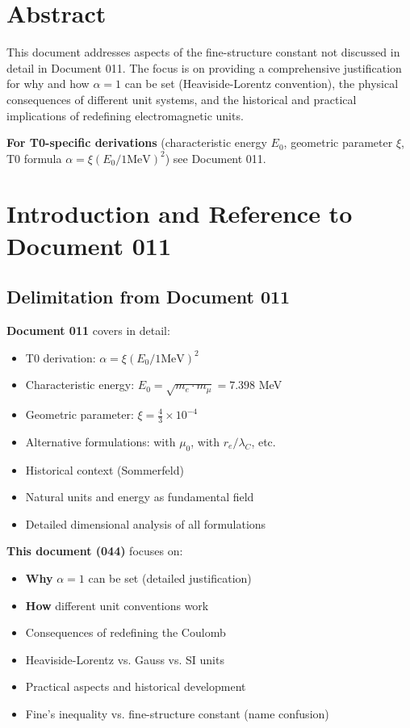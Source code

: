 \section*{Abstract}
		This document addresses aspects of the fine-structure constant not discussed in detail in Document 011. The focus is on providing a comprehensive justification for why and how $\alpha = 1$ can be set (Heaviside-Lorentz convention), the physical consequences of different unit systems, and the historical and practical implications of redefining electromagnetic units.
		
		\textbf{For T0-specific derivations} (characteristic energy $E_0$, geometric parameter $\xi$, T0 formula $\alpha = \xi(E_0/1\text{MeV})^2$) see Document 011.

	
	
	
	\section{Introduction and Reference to Document 011}
	
	\subsection{Delimitation from Document 011}
	
	\textbf{Document 011} covers in detail:
	\begin{itemize}
		\item T0 derivation: $\alpha = \xi(E_0/1\text{MeV})^2$
		\item Characteristic energy: $E_0 = \sqrt{m_e \cdot m_\mu} = 7.398$ MeV
		\item Geometric parameter: $\xi = \frac{4}{3} \times 10^{-4}$
		\item Alternative formulations: with $\mu_0$, with $r_e/\lambda_C$, etc.
		\item Historical context (Sommerfeld)
		\item Natural units and energy as fundamental field
		\item Detailed dimensional analysis of all formulations
	\end{itemize}
	
	\textbf{This document (044)} focuses on:
	\begin{itemize}
		\item \textbf{Why} $\alpha = 1$ can be set (detailed justification)
		\item \textbf{How} different unit conventions work
		\item Consequences of redefining the Coulomb
		\item Heaviside-Lorentz vs. Gauss vs. SI units
		\item Practical aspects and historical development
		\item Fine's inequality vs. fine-structure constant (name confusion)
	\end{itemize}
	
